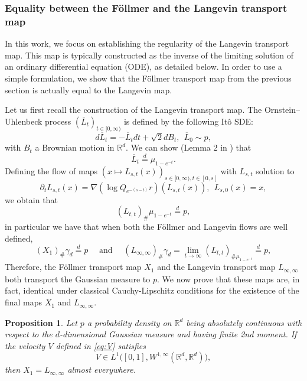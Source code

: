 \documentclass{article}
\newtheorem{proposition}{Proposition}
\begin{document}
\subsubsection{Equality between the Föllmer and the Langevin transport map}\label{sec:follandlang}
In this work, we focus on establishing the regularity of the Langevin transport map. This map is typically constructed as the inverse of the limiting solution of an ordinary differential equation (ODE), as detailed below. In order to use a simple formulation, we show that the Föllmer transport map from the previous section is actually equal to the Langevin map.

Let us first recall the construction of the Langevin transport map. The Ornstein–Uhlenbeck process $(\overline{L}_t)_{t\in [0,\infty)}$ is defined by the following Itô SDE:
\begin{equation*}
    d\overline{L}_t=-\overline{L}_tdt+\sqrt{2}dB_t,\ \ \overline{L}_0\sim p,
\end{equation*}
with $B_t$ a Brownian motion in $\mathbb{R}^d$. We can show (Lemma 2 in \cite{mikulincer2023lipschitz}) that
\begin{equation*}
\overline{L}_t\overset{d}{=}\mu_{1-e^{-t}}.
\end{equation*}
Defining the flow of maps 
$\left(x\mapsto L_{s,t}(x)\right)_{s\in [0,\infty),t\in [0,s]}$ with $L_{s,t}$ solution to
\begin{equation*}
 \partial_t L_{s,t}(x)=\nabla (\log Q_{e^{-(s-t)}} r)(L_{s,t}(x)), \ \ L_{s,0}(x)=x,   
\end{equation*}
we obtain that
$$(L_{t,t})_{\#}\mu_{1-e^{-t}}\overset{d}{=}p,$$
in particular we have that when both the Föllmer and Langevin flows are well defined,
$$
(X_{1})_{\#}\gamma_d\overset{d}{=}p \quad \text{ and } \quad (L_{\infty,\infty}) _{\# }\gamma_d=\lim_{t\rightarrow \infty}(L_{t,t})_{\#\mu_{1-e^{-t}}}\overset{d}{=}p,
$$
Therefore, the Föllmer transport map $X_1$ and the Langevin transport map $L_{\infty,\infty}$ both transport the Gaussian measure to $p$. We now prove that these maps are, in fact, identical under classical Cauchy-Lipschitz conditions for the existence of the final maps $X_1$ and $L_{\infty,\infty}$.
\begin{proposition}\label{prop:equalitytmaps}
    Let $p$  a probability density on $\mathbb{R}^d$ being absolutely continuous with respect to the $d$-dimensional Gaussian measure and having finite 2nd moment. If the velocity $V$ defined in \eqref{eq:V} satisfies 
    $$V\in L^1\Big([0,1],W^{1,\infty}(\mathbb{R}^d,\mathbb{R}^d)\Big),$$
then $X_1=L_{\infty,\infty}$ almost everywhere.
\end{proposition}
\end{document}
